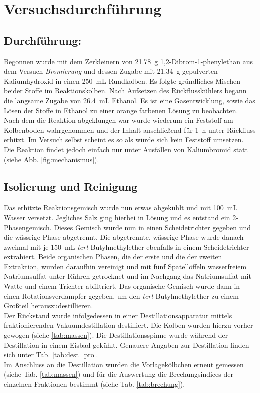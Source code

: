 \section{Versuchsdurchführung}
\label{sec:durchfuerung}
\vspace*{-5mm}
\vspace*{-3mm}
\subsection*{Durchführung:}
Begonnen wurde mit dem Zerkleinern von \SI{21,78}{\gram} 1,2-Dibrom-1-phenylethan aus dem Versuch \textit{Bromierung} und dessen Zugabe mit \SI{21,34}{\gram} gepulverten Kaliumhydroxid in einen \SI{250}{\milli \liter} Rundkolben. Es folgte gründliches Mischen beider Stoffe im Reaktionskolben. Nach Aufsetzen des Rückflusskühlers begann die langsame Zugabe von \SI{26,4}{\milli \liter} Ethanol. Es ist eine Gasentwicklung, sowie das Lösen der Stoffe in Ethanol zu einer orange farbenen Lösung zu beobachten. Nach dem die Reaktion abgeklungen war wurde wiederum ein Feststoff am Kolbenboden wahrgenommen und der Inhalt anschließend für \SI{1}{\hour} unter Rückfluss erhitzt. Im Versuch selbst scheint es so als würde sich kein Feststoff umsetzen. Die Reaktion findet jedoch einfach nur unter Ausfällen von Kaliumbromid statt (siehe Abb. \ref{fig:mechanismus}).

\subsection*{Isolierung und Reinigung}
Das erhitzte Reaktionsgemisch wurde nun etwas abgekühlt und mit \SI{100}{\milli \liter} Wasser versetzt. Jegliches Salz ging hierbei in Lösung und es entstand ein 2-Phasengemisch. Dieses Gemisch wurde nun in einen Scheidetrichter gegeben und die wässrige Phase abgetrennt. Die abgetrennte, wässrige Phase wurde danach zweimal mit je \SI{150}{\milli \liter} \textit{tert}-Butylmethylether ebenfalls in einem Scheidetrichter extrahiert.
Beide organischen Phasen, die der erste und die der zweiten Extraktion, wurden daraufhin vereinigt und mit fünf Spatellöffeln wasserfreiem Natriumsulfat unter Rühren getrocknet und im Nachgang das Natriumsulfat mit Watte und einem Trichter abfiltriert. Das organische Gemisch wurde dann in einen Rotationsverdampfer gegeben, um den \textit{tert}-Butylmethylether zu einem Großteil herauszudestillieren. \\
Der Rückstand wurde infolgedessen in einer Destillationsapparatur mittels fraktionierenden Vakuumdestillation destilliert. Die Kolben wurden hierzu vorher gewogen (siehe \ref{tab:massen}).
Die Destillationsspinne wurde während der Destillation in einem Eisbad gekühlt. Genauere Angaben zur Destillation finden sich unter Tab. \ref{tab:dest_pro}.\\
Im Anschluss an die Destillation wurden die Vorlagekölbchen erneut gemessen (siehe Tab. \ref{tab:massen}) und für die Auswertung die Brechungsindices der einzelnen Fraktionen bestimmt (siehe Tab. \ref{tab:brechung}). 

